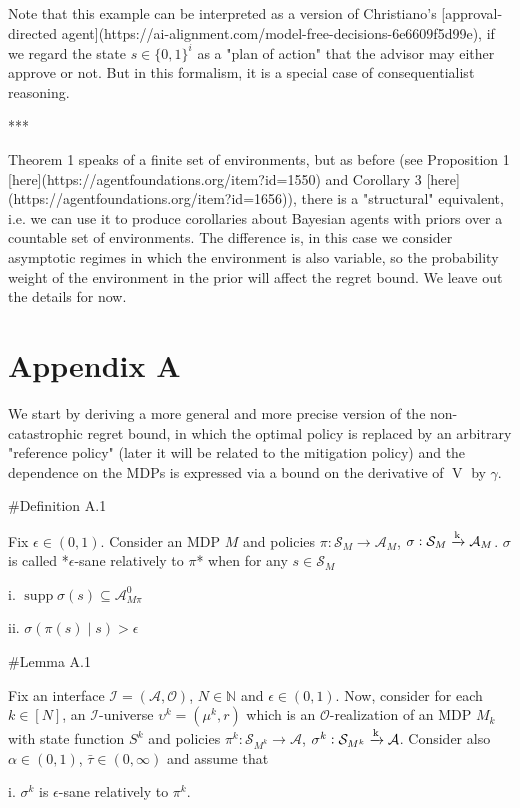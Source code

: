 \documentclass[a4paper]{article}
\newcommand{\Bool}{\{0,1\}}
\DeclareMathOperator{\Supp}{supp}
\newcommand{\AP}[1]{\left(#1\right)}
\newcommand{\Nats}{\mathbb{N}}
\newcommand{\M}{\xrightarrow{\textnormal{k}}}
\newcommand{\Ob}{\mathcal{O}}
\newcommand{\A}{\mathcal{A}}
\newcommand{\St}{\mathcal{S}}
\newcommand{\In}{\mathcal{I}}
\newcommand{\V}{\operatorname{V}}
\begin{document}
Note that this example can be interpreted as a version of Christiano's [approval-directed agent](https://ai-alignment.com/model-free-decisions-6e6609f5d99e), if we regard the state $s \in \Bool^{i}$ as a "plan of action" that the advisor may either approve or not. But in this formalism, it is a special case of consequentialist reasoning.

***

Theorem 1 speaks of a finite set of environments, but as before (see Proposition 1 [here](https://agentfoundations.org/item?id=1550) and Corollary 3 [here](https://agentfoundations.org/item?id=1656)), there is a "structural" equivalent, i.e. we can use it to produce corollaries about Bayesian agents with priors over a countable set of environments. The difference is, in this case we consider asymptotic regimes in which the environment is also variable, so the probability weight of the environment in the prior will affect the regret bound. We leave out the details for now.

\section{Appendix A}

We start by deriving a more general and more precise version of the non-catastrophic regret bound, in which the optimal policy is replaced by an arbitrary "reference policy" (later it will be related to the mitigation policy) and the dependence on the MDPs is expressed via a bound on the derivative of $\V$ by $\gamma$.

\#Definition A.1

Fix $\epsilon\in(0,1)$. Consider an MDP $M$ and policies $\pi: \St_M \rightarrow \A_M$, $\sigma: \St_M \M \A_M$. $\sigma$ is called *$\epsilon$-sane relatively to $\pi$* when for any $s \in \St_M$

i. $\Supp{\sigma(s)} \subseteq \A_{M\pi}^0$

ii. $\sigma\AP{\pi(s) \mid s} > \epsilon$

\#Lemma A.1

Fix an interface $\In=(\A,\Ob)$, $N \in \Nats$ and $\epsilon \in (0,1)$. Now, consider for each $k \in [N]$, an $\In$-universe $\upsilon^k=(\mu^k,r)$ which is an $\Ob$-realization of an MDP $M_k$ with state function $S^k$ and policies $\pi^k: \St_{M^k} \rightarrow \A$, $\sigma^k: \St_{M^k} \M \A$. Consider also $\alpha\in(0,1)$, $\bar{\tau} \in (0,\infty)$ and assume that 

i. $\sigma^k$ is $\epsilon$-sane relatively to $\pi^k$.
\end{document}
